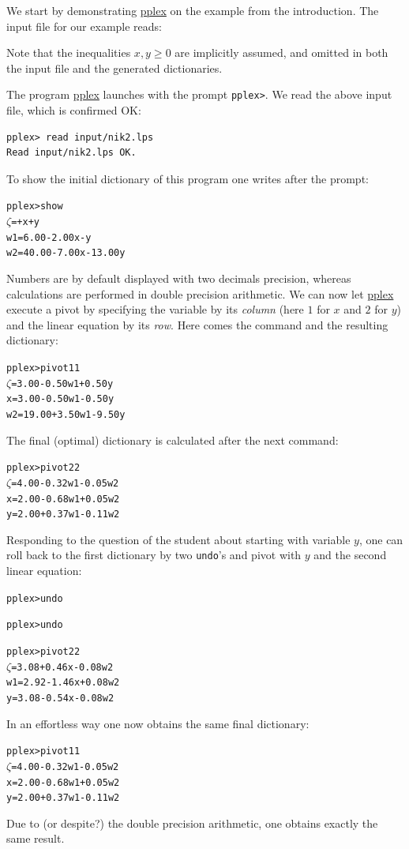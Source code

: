 \documentclass[ukenglish]{nik}
\begin{document}
We start by demonstrating \url{pplex} on the example from the introduction.
The input file for our example reads:
\begin{alltt}

\end{alltt}
Note that the inequalities $x,y \geq 0$ are implicitly assumed, and omitted in both the input file and the generated dictionaries.

The program \url{pplex} launches with the prompt \verb|pplex>|.
We read the above input file, which is confirmed OK:
\begin{verbatim}
pplex> read input/nik2.lps
Read input/nik2.lps OK.
\end{verbatim}
To show the initial dictionary of this program one writes after the prompt:
\begin{alltt}
pplex> show
 \(\zeta\) =       +     x +      y
w1 =  6.00 - 2.00x -      y
w2 = 40.00 - 7.00x - 13.00y
\end{alltt}
Numbers are by default displayed with two decimals precision, whereas
calculations are performed in double precision arithmetic.
We can now let \url{pplex} execute a pivot by specifying
the variable by its \emph{column} (here $1$ for $x$ and $2$ for $y$)
and the linear equation by its \emph{row}. 
Here comes the command and the resulting dictionary:
\begin{alltt}
pplex> pivot 1 1
 \(\zeta\) =  3.00 - 0.50w1 + 0.50y
 x =  3.00 - 0.50w1 - 0.50y
w2 = 19.00 + 3.50w1 - 9.50y
\end{alltt}
The final (optimal) dictionary is calculated after the next command:
\begin{alltt}
pplex> pivot 2 2
 \(\zeta\) = 4.00 - 0.32w1 - 0.05w2
 x = 2.00 - 0.68w1 + 0.05w2
 y = 2.00 + 0.37w1 - 0.11w2
\end{alltt}
Responding to the question of the student about starting with variable $y$, 
one can roll back to the first dictionary by two \verb|undo|'s and pivot
with $y$ and the second linear equation:
\begin{alltt}
pplex> undo

pplex> undo

pplex> pivot 2 2
 \(\zeta\) = 3.08 + 0.46x - 0.08w2
w1 = 2.92 - 1.46x + 0.08w2
 y = 3.08 - 0.54x - 0.08w2
\end{alltt}
In an effortless way one now obtains the same final dictionary:
\begin{alltt}
pplex> pivot 1 1 
 \(\zeta\) = 4.00 - 0.32w1 - 0.05w2
 x = 2.00 - 0.68w1 + 0.05w2
 y = 2.00 + 0.37w1 - 0.11w2
\end{alltt}
Due to (or despite?) the double precision arithmetic, one obtains exactly the same result.
\end{document}
